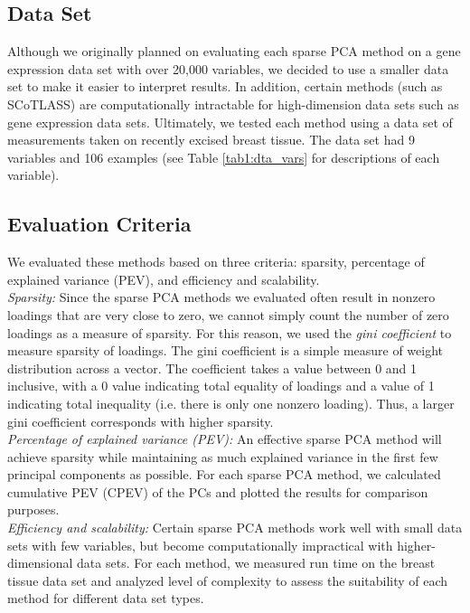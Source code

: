 \documentclass[12pt,letterpaper]{report}
\begin{document}
\subsection*{Data Set}

Although we originally planned on evaluating each sparse PCA method on a gene expression data set with over 20,000 variables, we decided to use a smaller data set to make it easier to interpret results. In addition, certain methods (such as SCoTLASS) are computationally intractable for high-dimension data sets such as gene expression data sets. Ultimately, we tested each method using a data set of measurements taken on recently excised breast tissue. The data set had 9 variables and 106 examples (see Table \ref{tab1:dta_vars} for descriptions of each variable). \\

\subsection*{Evaluation Criteria}

We evaluated these methods based on three criteria: sparsity, percentage of explained variance (PEV), and efficiency and scalability.\\

\textit{Sparsity:} Since the sparse PCA methods we evaluated often result in nonzero loadings that are very close to zero, we cannot simply count the number of zero loadings as a measure of sparsity. For this reason, we used the \textit{gini coefficient} to measure sparsity of loadings. The gini coefficient is a simple measure of weight distribution across a vector. The coefficient takes a value between 0 and 1 inclusive, with a 0 value indicating total equality of loadings and a value of 1 indicating total inequality (i.e. there is only one nonzero loading). Thus, a larger gini coefficient corresponds with higher sparsity. \\

\textit{Percentage of explained variance (PEV):} An effective sparse PCA method will achieve sparsity while maintaining as much explained variance in the first few principal components as possible. For each sparse PCA method, we calculated cumulative PEV (CPEV) of the PCs and plotted the results for comparison purposes. \\

\textit{Efficiency and scalability:} Certain sparse PCA methods work well with small data sets with few variables, but become computationally impractical with higher-dimensional data sets. For each method, we measured run time on the breast tissue data set and analyzed level of complexity to assess the suitability of each method for different data set types.\\
\end{document}
